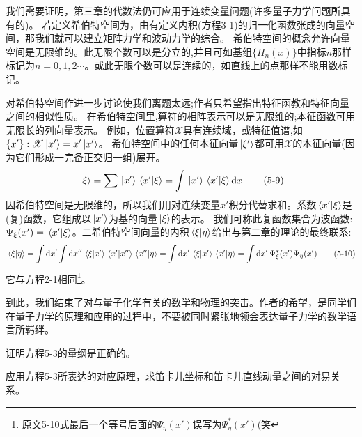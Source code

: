 我们需要证明，第三章的代数法仍可应用于连续变量问题(许多量子力学问题所具有的)。
若定义希伯特空间为，由有定义内积(方程3-1)的归一化函数张成的向量空间，那我们就可以建立矩阵力学和波动力学的综合。
希伯特空间的概念允许向量空间是无限维的。此无限个数可以是分立的,并且可如基组$\{H_n(x)\}$中指标$n$那样标记为$n=0,1,2\cdots$。或此无限个数可以是连续的，如直线上的点那样不能用数标记。

对希伯特空间作进一步讨论使我们离题太远;作者只希望指出特征函教和特征向量之间的相似性质。
在希伯特空间里,算符的相阵表示可以是无限维的;本征函数可用无限长的列向量表示。
例如，位置算符$\mathscr{X}$具有连续域，或特征值谱,如$\{x'\}:\mathscr{X}\ket*{x'}=x'\ket*{x'}$。
希伯特空间中的任何本征向量$\ket*{\xi'}$都可用$\mathscr{X}$的本征向量(因为它们形成一完备正交归一组)展开。
\[\ket*{\xi}=\sum\ket*{x'}\bra*{x'}\ket*{\xi}=\int\ket*{x'}\bra*{x'}\ket*{\xi}\dd{x} \tag{5-9}\]
因希伯特空间是无限维的，所以我们用对连续变量$x'$积分代替求和。系数$\bra*{x'}\ket*{\xi}$是(复)函数，它组成以$\ket*{x'}$为基的向量$\ket*{\xi}$的表示。
我们可称此复函数集合为波函数:$\Psi_{\xi}(x')=\bra*{x'}\ket*{\xi}$。二希伯特空间向量的内积$\bra*{\xi}\ket*{\eta}$给出与第二章的理论的最终联系:
\[\bra*{\xi}\ket*{\eta}=\int \dd{x}'\int \dd{x}''\bra*{\xi}\ket*{x'}\bra*{x'}\ket*{x''}\bra*{x''}\ket*{\eta}=\int \dd{x}'\bra*{\xi}\ket*{x'}\bra*{x'}\ket*{\eta}=\int \dd{x}'\Psi_{\xi}^*(x')\Psi_{\eta}(x') \tag{5-10}\]
它与方程2-1相同\footnote{原文5-10式最后一个等号后面的$\Psi_{\eta}(x')$误写为$\Psi^*_{\eta}(x')$(笑}。

到此，我们结束了对与量子化学有关的数学和物理的突击。作者的希望，是同学们在量子力学的原理和应用的过程中，不要被同时紧张地领会表达量子力学的数学语言所羁绊。

\begin{problemset}
\item 证明方程5-3的量纲是正确的。
\item 应用方程5-3所表达的对应原理，求笛卡儿坐标和笛卡儿直线动量之间的对易关系。
\end{problemset}